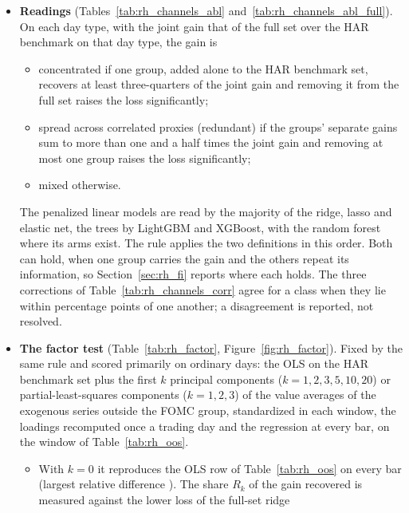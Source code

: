 \begin{itemize}
\begin{itemize}
    none was dropped after scoring.
  \end{itemize}
\item \textbf{Readings} (Tables~\ref{tab:rh_channels_abl} and~\ref{tab:rh_channels_abl_full}). On each day type,
  with the joint gain that of the full set over the HAR benchmark on that day type, the gain is
  \begin{itemize}
  \item concentrated if one group, added alone to the HAR benchmark set, recovers at least three-quarters of the joint
    gain and removing it from the full set raises the loss significantly;
  \item spread across correlated proxies (redundant) if the groups' separate gains sum to more than one and a half
    times the joint gain and removing at most one group raises the loss significantly;
  \item mixed otherwise.
  \end{itemize}
  The penalized linear models are read by the majority of the ridge, lasso and elastic net, the trees by LightGBM and
  XGBoost, with the random forest where its arms exist. The rule applies the two definitions in this order. Both can
  hold, when one group carries the gain and the others repeat its information, so Section~\ref{sec:rh_fi} reports
  where each holds. The three corrections of Table~\ref{tab:rh_channels_corr} agree for a class when they lie within
  \rhchAgreePp{} percentage points of one another; a disagreement is reported, not resolved.
\item \textbf{The factor test} (Table~\ref{tab:rh_factor}, Figure~\ref{fig:rh_factor}). Fixed by the same rule and
  scored primarily on ordinary days: the OLS on the HAR benchmark set plus the first $k$ principal components
  ($k = 1, 2, 3, 5, 10, 20$) or partial-least-squares components ($k = 1, 2, 3$) of the \rhfaNBlock{} value averages
  of the \rhfaNSeries{} exogenous series outside the FOMC group, standardized in each window, the loadings recomputed
  once a trading day and the regression at every bar, on the window of Table~\ref{tab:rh_oos}.
  \begin{itemize}
  \item With $k = 0$ it reproduces the OLS row of Table~\ref{tab:rh_oos} on every bar (largest relative difference
    \rhfaGOneMaxRel). The share $R_k$ of the gain recovered is measured against the lower loss of the full-set ridge

\end{itemize}
\end{itemize}
